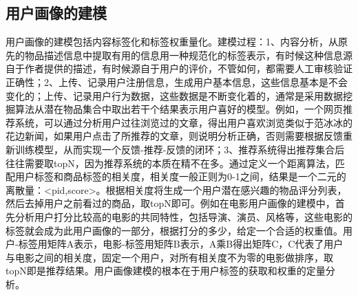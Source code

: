 		\begin{figure}
	    \centering
	      \label{pic:user_profile}
	    \end{figure}

		\subsection{用户画像的建模}
		用户画像的建模包括内容标签化和标签权重量化。建模过程：1、内容分析，从原先的物品描述信息中提取有用的信息用一种规范化的标签表示，有时候这种信息源自于作者提供的描述，有时候源自于用户的评价，不管如何，都需要人工审核验证正确性；2、上传、记录用户注册信息，生成用户基本信息，这些信息基本是不会变化的；上传、记录用户行为数据，这些数据是不断变化着的，通常是采用数据挖掘算法从潜在物品集合中取出若干个结果表示用户喜好的模型。例如，一个网页推荐系统，可以通过分析用户过往浏览过的文章，得出用户喜欢浏览类似于范冰冰的花边新闻，如果用户点击了所推荐的文章，则说明分析正确，否则需要根据反馈重新训练模型，从而实现一个反馈-推荐-反馈的闭环；3、推荐系统得出推荐集合后往往需要取topN，因为推荐系统的本质在精不在多。通过定义一个距离算法，匹配用户标签和商品标签的相关度，相关度一般正则为0-1之间，结果是一个二元的离散量：<pid,score>。根据相关度将生成一个用户潜在感兴趣的物品评分列表，然后去掉用户之前看过的商品，取topN即可。例如在电影用户画像的建模中，首先分析用户打分比较高的电影的共同特性，包括导演、演员、风格等，这些电影的标签就会成为此用户画像的一部分，根据打分的多少，给定一个合适的权重值。用户-标签用矩阵A表示，电影-标签用矩阵B表示，A乘B得出矩阵C，C代表了用户与电影之间的相关度，固定一个用户，对所有相关度不为零的电影做排序，取topN即是推荐结果。用户画像建模的根本在于用户标签的获取和权重的定量分析。

